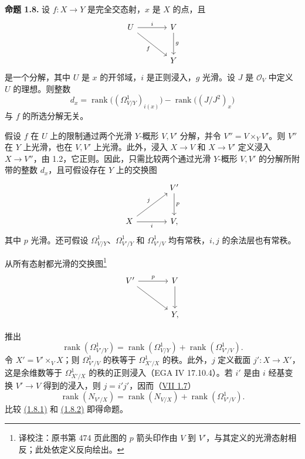 \textbf{命题 1.8.} 设 $f:X\to Y$ 是完全交态射，$x$ 是 $X$ 的点，且
\[
\begin{tikzcd}[column sep=large,row sep=large]
U \arrow[r,"i"] \arrow[dr,"f"'] & V \arrow[d,"g"]\\
& Y
\end{tikzcd}
\]
是一个分解，其中 $U$ 是 $x$ 的开邻域，$i$ 是正则浸入，$g$ 光滑。设 $J$ 是 $\mathcal O_V$ 中定义 $U$ 的理想。则整数
\[
d_x=\operatorname{rank}\bigl((\Omega^1_{V/Y})_{i(x)}\bigr)-\operatorname{rank}\bigl((J/J^2)_x\bigr)
\]
与 $f$ 的所选分解无关。

假设 $f$ 在 $U$ 上的限制通过两个光滑 $Y$-概形 $V,V'$ 分解，并令 $V''=V\times_Y V'$。则 $V''$ 在 $Y$ 上光滑，也在 $V,V'$ 上光滑。此外，浸入 $X\to V$ 和 $X\to V'$ 定义浸入 $X\to V''$，由 1.2，它正则。因此，只需比较两个通过光滑 $Y$-概形 $V,V'$ 的分解所附带的整数 $d_x$，且可假设存在 $Y$ 上的交换图
\[
\begin{tikzcd}[column sep=large,row sep=large]
& V' \arrow[d,"p"]\\
X \arrow[ur,"j"] \arrow[r,"i"'] & V,
\end{tikzcd}
\]
其中 $p$ 光滑。还可假设 $\Omega^1_{V/Y}$、$\Omega^1_{V'/Y}$ 和 $\Omega^1_{V'/V}$ 均有常秩，$i,j$ 的余法层也有常秩。

从所有态射都光滑的交换图\footnote{译校注：原书第 474 页此图的 $p$ 箭头印作由 $V$ 到 $V'$，与其定义的光滑态射相反；此处依定义反向绘出。}
\[
\begin{tikzcd}[column sep=large,row sep=large]
V' \arrow[r,"p"] \arrow[dr] & V \arrow[d]\\
& Y,
\end{tikzcd}
\]

推出
\begin{equation}\tag{1.8.1}
\operatorname{rank}(\Omega^1_{V'/Y})=
\operatorname{rank}(\Omega^1_{V/Y})+
\operatorname{rank}(\Omega^1_{V'/V}).
\end{equation}
令 $X'=V'\times_V X$；则 $\Omega^1_{V'/V}$ 的秩等于 $\Omega^1_{X'/X}$ 的秩。此外，$j$ 定义截面 $j':X\to X'$，这是余维数等于 $\Omega^1_{X'/X}$ 的秩的正则浸入（EGA IV 17.10.4）。若 $i'$ 是由 $i$ 经基变换 $V'\to V$ 得到的浸入，则 $j=i'j'$，因而（\hyperlink{sga6.e07.prop.1-7}{VII 1.7}）
\begin{equation}\tag{1.8.2}
\operatorname{rank}(N_{V'/X})=
\operatorname{rank}(N_{V/X})+
\operatorname{rank}(\Omega^1_{V'/V}).
\end{equation}
比较 \hyperlink{sga6.e08.eq.1-8-1}{(1.8.1)} 和 \hyperlink{sga6.e08.eq.1-8-2}{(1.8.2)} 即得命题。


